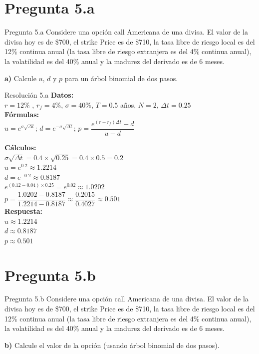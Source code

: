 \documentclass{beamer}
\begin{document}
\section{Pregunta 5.a}
\begin{frame}{Pregunta 5.a}
  \justify
  Considere una opción call Americana de una divisa. El valor de la divisa hoy es de \$700, 
el strike Price es de \$710, la tasa libre de riesgo local es del 12\% continua anual 
(la tasa libre de riesgo extranjera es del 4\% continua anual), la volatilidad es del 
40\% anual y la madurez del derivado es de 6 meses.

\vspace{1em}
\textbf{a)} Calcule $u$, $d$ y $p$ para un árbol binomial de dos pasos.
\end{frame}

\begin{frame}{Resolución 5.a}
\justify
\textbf{Datos:} \\
$r=12\%$ , $r_f =4\%$, $\sigma=40\%$, $T=0.5$ años, $N=2$, $\Delta t = 0.25$ \\

\textbf{Fórmulas:} \\
$u = e^{\sigma \sqrt{\Delta t}}$; $d = e^{-\sigma \sqrt{\Delta t}}$; $p = \dfrac{e^{(r-r_f)\Delta t} - d}{u - d}$

\textbf{Cálculos:} \\
$\sigma\sqrt{\Delta t} = 0.4 \times \sqrt{0.25} = 0.4 \times 0.5 = 0.2$ \\

$u = e^{0.2} \approx 1.2214$ \\
$d = e^{-0.2} \approx 0.8187$ \\

$e^{(0.12-0.04)\times 0.25} = e^{0.02} \approx 1.0202$ \\

$p = \dfrac{1.0202 - 0.8187}{1.2214 - 0.8187} \approx \dfrac{0.2015}{0.4027} \approx 0.501$ \\

\textbf{Respuesta:} \\
$u \approx 1.2214$ \\
$d \approx 0.8187$ \\
$p \approx 0.501$ \\
\end{frame}

\section{Pregunta 5.b}
\begin{frame}{Pregunta 5.b}
  \justify
  Considere una opción call Americana de una divisa. El valor de la divisa hoy es de \$700, 
el strike Price es de \$710, la tasa libre de riesgo local es del 12\% continua anual 
(la tasa libre de riesgo extranjera es del 4\% continua anual), la volatilidad es del 
40\% anual y la madurez del derivado es de 6 meses.

\vspace{1em}
\textbf{b)} Calcule el valor de la opción (usando árbol binomial de dos pasos).
\end{frame}
\end{document}
